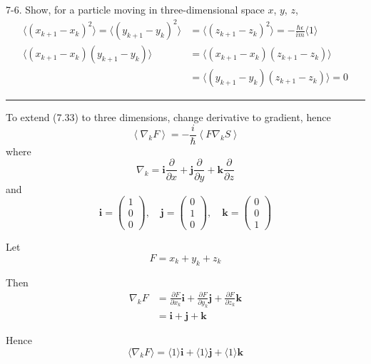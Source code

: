 \documentclass[12pt]{article}
\begin{document}
7-6.
Show, for a particle moving in three-dimensional space $x$, $y$, $z$,
\begin{align*}
\langle(x_{k+1}-x_k)^2\rangle
=\langle(y_{k+1}-y_k)^2\rangle
&=\langle(z_{k+1}-z_k)^2\rangle
=-\frac{\hbar\epsilon}{im}\langle1\rangle
\tag{7.50}
\\
\langle(x_{k+1}-x_k)(y_{k+1}-y_k)\rangle
&=\langle(x_{k+1}-x_k)(z_{k+1}-z_k)\rangle
\\
&=\langle(y_{k+1}-y_k)(z_{k+1}-z_k)\rangle=0
\tag{7.51}
\end{align*}

\bigskip
\hrule

\bigskip
To extend (7.33) to three dimensions, change derivative to gradient, hence
\begin{equation*}
\left\langle\nabla_kF\right\rangle=-\frac{i}{\hbar}\left\langle F\nabla_kS\right\rangle
\tag{1}
\end{equation*}
where
\begin{equation*}
\nabla_k
=\mathbf i\frac{\partial}{\partial x}
+\mathbf j\frac{\partial}{\partial y}
+\mathbf k\frac{\partial}{\partial z}
\end{equation*}
and
\begin{equation*}
\mathbf i=\begin{pmatrix}1\\0\\0\end{pmatrix},
\quad
\mathbf j=\begin{pmatrix}0\\1\\0\end{pmatrix},
\quad
\mathbf k=\begin{pmatrix}0\\0\\1\end{pmatrix}
\end{equation*}

Let
\begin{equation*}
F=x_k+y_k+z_k
\end{equation*}

Then
\begin{align*}
\nabla_kF
&=\frac{\partial F}{\partial x_k}\mathbf i
+\frac{\partial F}{\partial y_k}\mathbf j
+\frac{\partial F}{\partial z_k}\mathbf k
\\
&=\mathbf i+\mathbf j+\mathbf k
\end{align*}

Hence
\begin{equation*}
\langle\nabla_kF\rangle
=\langle1\rangle\mathbf i
+\langle1\rangle\mathbf j
+\langle1\rangle\mathbf k
\tag{2}
\end{equation*}
\end{document}
